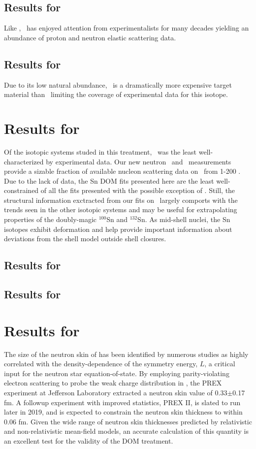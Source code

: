 \subsection{Results for \niEight}
Like \caForty, \niEight\ has enjoyed attention from experimentalists for many decades yielding
an abundance of proton and neutron elastic scattering data.
\subsection{Results for \niFour}
Due to its low natural abundance, \niFour\ is a dramatically more expensive target material than
\niEight\, limiting the coverage of experimental data for this isotope.

\section{Results for \snTwelveFour}
Of the isotopic systems studed in this treatment, \snTwelveFour\ was the least well-characterized by
experimental data. Our new neutron \tot\ and \el\ measurements provide a sizable fraction
of available nucleon scattering data on \snTwelveFour\ from 1-200 \mega\electronvolt. Due to the
lack of data, the Sn DOM fits presented here are the least well-constrained of all the fits
presented with the possible exception of \niFour. Still, the structural information exctracted from
our fits on \snTwelveFour\ largely comports with the trends seen in the other isotopic systems and
may be useful for extrapolating properties of the doubly-magic $^{100}$Sn and $^{132}$Sn. As
mid-shell nuclei, the Sn isotopes exhibit deformation and help provide important information
about deviations from the shell model outside shell closures. 
\subsection{Results for \snTwelve}
\subsection{Results for \snFour}

\section{Results for \pbEight}
The size of the neutron skin of \pbEight has been identified by numerous studies as highly
correlated with the density-dependence of the symmetry energy, $L$, a critical input for the neutron
star equation-of-state. By employing parity-violating electron scattering to probe the
weak charge distribution in \pbEight, the PREX experiment at Jefferson Laboratory extracted a
\pbEight neutron skin value of 0.33$\pm$0.17 fm. A followup experiment with improved statistics, PREX II,
is slated to run later in 2019, and is expected to constrain the \pbEight neutron skin thickness to
within 0.06 fm. Given the wide range of \pbEight neutron skin thicknesses predicted by relativistic
and non-relativistic mean-field models, an accurate calculation of this quantity is an excellent
test for the validity of the DOM treatment.

